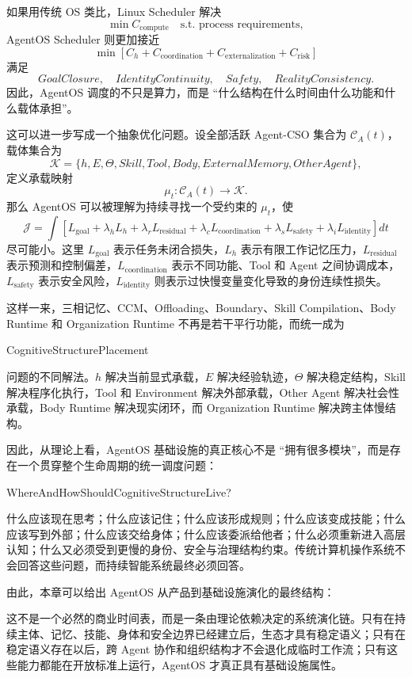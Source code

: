 如果用传统 OS 类比，Linux Scheduler 解决
\[
\min C_{\mathrm{compute}}
\quad
\text{s.t. process requirements},
\]
AgentOS Scheduler 则更加接近
\[
\min
\left[
C_h+
C_{\mathrm{coordination}}+
C_{\mathrm{externalization}}+
C_{\mathrm{risk}}
\right]
\]
满足
\[
GoalClosure,\quad
IdentityContinuity,\quad
Safety,\quad
RealityConsistency.
\]
因此，AgentOS 调度的不只是算力，而是 ``什么结构在什么时间由什么功能和什么载体承担''。

这可以进一步写成一个抽象优化问题。设全部活跃 Agent-CSO 集合为 $\mathcal C_A(t)$，载体集合为
\[
\mathcal K
=
\{
h,E,\Theta,Skill,Tool,Body,ExternalMemory,OtherAgent
\},
\]
定义承载映射
\[
\mu_t:
\mathcal C_A(t)
\rightarrow
\mathcal K.
\]
那么 AgentOS 可以被理解为持续寻找一个受约束的 $\mu_t$，使
\[
\mathcal J
=
\int
\left[
L_{\mathrm{goal}}
+
\lambda_hL_h
+
\lambda_rL_{\mathrm{residual}}
+
\lambda_cL_{\mathrm{coordination}}
+
\lambda_sL_{\mathrm{safety}}
+
\lambda_iL_{\mathrm{identity}}
\right]dt
\]
尽可能小。这里 $L_{\mathrm{goal}}$ 表示任务未闭合损失，$L_h$ 表示有限工作记忆压力，$L_{\mathrm{residual}}$ 表示预测和控制偏差，$L_{\mathrm{coordination}}$ 表示不同功能、Tool 和 Agent 之间协调成本，$L_{\mathrm{safety}}$ 表示安全风险，$L_{\mathrm{identity}}$ 则表示过快慢变量变化导致的身份连续性损失。

这样一来，三相记忆、CCM、Offloading、Boundary、Skill Compilation、Body Runtime 和 Organization Runtime 不再是若干平行功能，而统一成为
\begin{statementbox}
CognitiveStructurePlacement
\end{statementbox}
问题的不同解法。$h$ 解决当前显式承载，$E$ 解决经验轨迹，$\Theta$ 解决稳定结构，Skill 解决程序化执行，Tool 和 Environment 解决外部承载，Other Agent 解决社会性承载，Body Runtime 解决现实闭环，而 Organization Runtime 解决跨主体慢结构。

因此，从理论上看，AgentOS 基础设施的真正核心不是 ``拥有很多模块''，而是存在一个贯穿整个生命周期的统一调度问题：
\begin{statementbox}
WhereAndHowShouldCognitiveStructureLive?
\end{statementbox}
什么应该现在思考；什么应该记住；什么应该形成规则；什么应该变成技能；什么应该写到外部；什么应该交给身体；什么应该委派给他者；什么必须重新进入高层认知；什么又必须受到更慢的身份、安全与治理结构约束。传统计算机操作系统不会回答这些问题，而持续智能系统最终必须回答。

由此，本章可以给出 AgentOS 从产品到基础设施演化的最终结构：
\begin{statementbox}
\centering
{}
\end{statementbox}
这不是一个必然的商业时间表，而是一条由理论依赖决定的系统演化链。只有在持续主体、记忆、技能、身体和安全边界已经建立后，生态才具有稳定语义；只有在稳定语义存在以后，跨 Agent 协作和组织结构才不会退化成临时工作流；只有这些能力都能在开放标准上运行，AgentOS 才真正具有基础设施属性。


